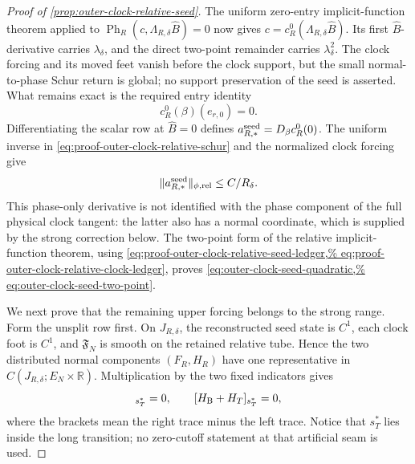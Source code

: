 \begin{proof}[Proof of \cref{prop:outer-clock-relative-seed}]
The uniform zero-entry implicit-function theorem applied to
\(\operatorname{Ph}_R(c,\Lambda_{R,\delta}\widehat B)=0\) now gives
\(c=c_R^0(\Lambda_{R,\delta}\widehat B)\).  Its first
\(\widehat B\)-derivative carries
\(\lambda_\delta\), and the direct two-point remainder carries
\(\lambda_\delta^2\).  The clock forcing and its moved feet vanish before
the clock support, but the small normal-to-phase Schur return is global;
no support preservation of the seed is asserted.  What remains exact is
the required entry identity
\begin{equation}
 c_R^0(\beta)(e_{r,0})=0.                       \label{eq:proof-outer-clock-seed-support}
\end{equation}
Differentiating the scalar row at \(\widehat B=0\) defines
\(a_{R,*}^{\rm seed}=D_\beta c_R^0(0)\).  The uniform inverse in
\cref{eq:proof-outer-clock-relative-schur} and the normalized clock
forcing give
\[
 \|a_{R,*}^{\rm seed}\|_{\phi,\rm rel}\le C/R_\delta.
\]
This phase-only derivative is not identified with the phase component of
the full physical clock tangent: the latter also has a normal coordinate,
which is supplied by the strong correction below.
The two-point form of the relative implicit-function theorem, using
\cref{eq:proof-outer-clock-relative-seed-ledger,%
eq:proof-outer-clock-relative-clock-ledger}, proves
\cref{eq:outer-clock-seed-quadratic,%
eq:outer-clock-seed-two-point}.

We next prove that the remaining upper forcing belongs to the strong
range.  Form the unsplit row first.  On \(J_{R,\delta}\), the reconstructed
seed state is \(C^1\), each clock foot is \(C^1\), and
\(\mathfrak F_N\) is smooth on the retained relative tube.  Hence the
two distributed normal components
\((F_R,H_R)\) have one representative in
\(C(J_{R,\delta};E_N\times\mathbb R)\).  Multiplication by the two fixed
indicators gives
\begin{equation}
 [F_{\rm B}+F_T]_{s_T^*}=0,\qquad
 [H_{\rm B}+H_T]_{s_T^*}=0,                    \label{eq:proof-outer-clock-total-source-seam}
\end{equation}
where the brackets mean the right trace minus the left trace.  Notice
that \(s_T^*\) lies inside the long transition; no zero-cutoff statement
at that artificial seam is used.


\end{proof}
